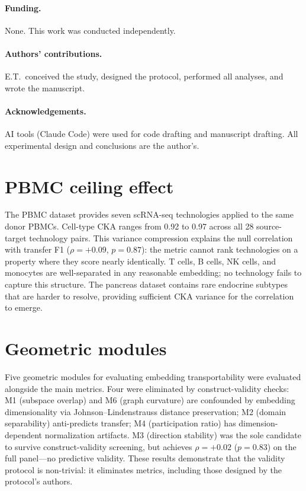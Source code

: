 \documentclass[11pt]{article}
\begin{document}
\paragraph{Funding.} None. This work was conducted independently.

\paragraph{Authors' contributions.} E.T.\ conceived the study,
designed the protocol, performed all analyses, and wrote the
manuscript.

\paragraph{Acknowledgements.} AI tools (Claude Code) were used for code
drafting and manuscript drafting. All experimental design and conclusions
are the author's.


\appendix

\section{PBMC ceiling effect}
\label{app:pbmc}

The PBMC dataset \citep{ding2020systematic} provides seven scRNA-seq
technologies applied to the same donor PBMCs. Cell-type CKA ranges from
0.92 to 0.97 across all 28 source-target technology pairs. This
variance compression explains the null correlation with transfer F1
($\rho = +0.09$, $p = 0.87$): the metric cannot rank technologies on
a property where they score nearly identically. T cells, B cells, NK
cells, and monocytes are well-separated in any reasonable embedding; no
technology fails to capture this structure. The pancreas dataset contains
rare endocrine subtypes that are harder to resolve, providing sufficient
CKA variance for the correlation to emerge.


\section{Geometric modules}
\label{app:modules}

Five geometric modules for evaluating embedding transportability were
evaluated alongside the main metrics. Four were
eliminated by construct-validity checks: M1 (subspace overlap) and M6
(graph curvature) are confounded by embedding dimensionality via
Johnson--Lindenstrauss distance preservation; M2 (domain separability)
anti-predicts transfer; M4 (participation ratio) has
dimension-dependent normalization artifacts. M3 (direction stability)
was the sole candidate to survive construct-validity screening, but
achieves $\rho = +0.02$ ($p = 0.83$) on the full panel---no
predictive validity. These results demonstrate that the validity
protocol is non-trivial: it eliminates metrics, including those designed
by the protocol's authors.
\end{document}
